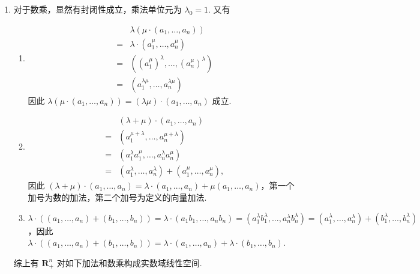 \begin{enumerate}
\begin{enumerate}
\begin{enumerate}
                        \item 对于数乘，显然有封闭性成立，乘法单位元为 $\lambda_0=1$. 又有
                              \begin{enumerate}
                                  \item \begin{align*}
                                                & \lambda(\mu\cdot(a_1,\ldots,a_n))            \\
                                            ={} & \lambda\cdot(a_1^\mu,\ldots,a_n^\mu)         \\
                                            ={} & ((a_1^\mu)^\lambda,\ldots,(a_n^\mu)^\lambda) \\
                                            ={} & (a_1^{\lambda\mu},\ldots,a_n^{\lambda\mu})
                                        \end{align*}
                                        因此 $\lambda(\mu\cdot(a_1,\ldots,a_n))=(\lambda\mu)\cdot(a_1,\ldots,a_n)$ 成立.

                                  \item \begin{align*}
                                                & (\lambda+\mu)\cdot(a_1,\ldots,a_n)                         \\
                                            ={} & (a_1^{\mu+\lambda},\ldots,a_n^{\mu+\lambda})               \\
                                            ={} & (a_1^\lambda a_1^\mu,\ldots,a_n^\lambda a_n^\mu)           \\
                                            ={} & (a_1^\lambda,\ldots,a_n^\lambda)+(a_1^\mu,\ldots,a_n^\mu),
                                        \end{align*}
                                        因此 $(\lambda+\mu)\cdot(a_1,\ldots,a_n)=\lambda\cdot(a_1,\ldots,a_n)+\mu(a_1,\ldots,a_n)$，第一个加号为数的加法，第二个加号为定义的向量加法.

                                  \item $\lambda\cdot((a_1,\ldots,a_n)+(b_1,\ldots,b_n))=\lambda\cdot(a_1b_1,\ldots,a_nb_n)=(a_1^\lambda b_1^\lambda,\ldots,a_n^\lambda b_n^\lambda)=(a_1^\lambda,\ldots,a_n^\lambda)+(b_1^\lambda,\ldots,b_n^\lambda)$，因此 $\lambda\cdot((a_1,\ldots,a_n)+(b_1,\ldots,b_n))=\lambda\cdot(a_1,\ldots,a_n)+\lambda\cdot(b_1,\ldots,b_n)$.
                              \end{enumerate}
                              综上有 $\mathbf{R}_+^n$ 对如下加法和数乘构成实数域线性空间.
                    \end{enumerate}


\end{enumerate}
\end{enumerate}
